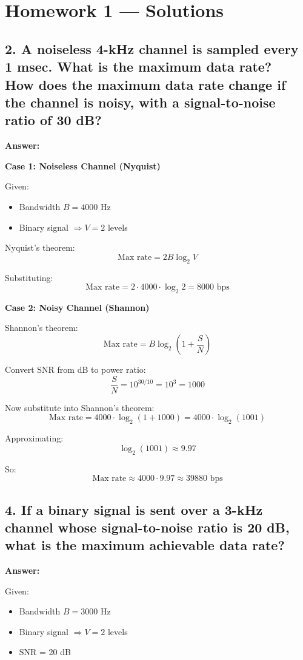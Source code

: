 \documentclass{article}
\begin{document}
\section*{Homework 1 --- Solutions}

\subsection*{2. A noiseless 4-kHz channel is sampled every 1 msec. What is the maximum data rate?\\
How does the maximum data rate change if the channel is noisy, with a signal-to-noise ratio of 30 dB?}

\textbf{Answer:}

\textbf{Case 1: Noiseless Channel (Nyquist)}

Given:
\begin{itemize}[noitemsep]
  \item Bandwidth $B = 4000$ Hz
  \item Binary signal $\Rightarrow V = 2$ levels
\end{itemize}

Nyquist's theorem:
\[
\text{Max rate} = 2B \log_2 V
\]

Substituting:
\[
\text{Max rate} = 2 \cdot 4000 \cdot \log_2 2 = 8000 \text{ bps}
\]

\textbf{Case 2: Noisy Channel (Shannon)}

Shannon's theorem:
\[
\text{Max rate} = B \log_2\left(1 + \frac{S}{N} \right)
\]

Convert SNR from dB to power ratio:
\[
\frac{S}{N} = 10^{30/10} = 10^3 = 1000
\]

Now substitute into Shannon’s theorem:
\[
\text{Max rate} = 4000 \cdot \log_2(1 + 1000) = 4000 \cdot \log_2(1001)
\]

Approximating:
\[
\log_2(1001) \approx 9.97
\]

So:
\[
\text{Max rate} \approx 4000 \cdot 9.97 \approx 39880 \text{ bps}
\]

\subsection*{4. If a binary signal is sent over a 3-kHz channel whose signal-to-noise ratio is 20 dB, what is the maximum achievable data rate?}

\textbf{Answer:}

Given:
\begin{itemize}[noitemsep]
  \item Bandwidth $B = 3000$ Hz
  \item Binary signal $\Rightarrow V = 2$ levels
  \item SNR = 20 dB
\end{itemize}
\end{document}
